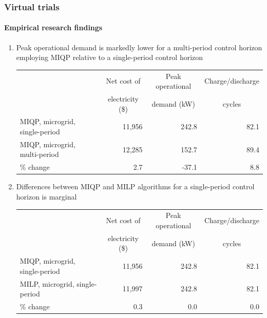 \documentclass[handout, smaller, xcolor=table]{beamer}			%
\newcounter{enumcount}
\begin{document}
\begin{frame}
	\frametitle{Virtual trials}
	\framesubtitle{Empirical research findings}

	\begin{enumerate}
		\setcounter{enumi}{\value{enumcount}}		
		\item  Peak operational demand is markedly lower for a multi-period control horizon employing MIQP relative to a single-period control horizon
			\begin{table}[!h]
			\centering
			{\scriptsize
			\begin{tabular}{l r r r}
				\toprule
				& \multicolumn{1}{c}{Net cost of}	& \multicolumn{1}{c}{Peak operational}	& \multicolumn{1}{c}{Charge/discharge}	\\
				& \multicolumn{1}{c}{	electricity (\$)} 	& \multicolumn{1}{c}{demand (kW)}		&\multicolumn{1}{c}{cycles}	\\
				\midrule
				MIQP, microgrid, single-period		& 11,956	& 242.8	& 82.1	\\
				MIQP, microgrid, multi-period		& 12,285	& 152.7	& 89.4	\\
				\midrule
				\% change	& 2.7		& -37.1	& 8.8		\\
				\bottomrule
			\end{tabular}
			}
			\end{table}
		
		\item  Differences between MIQP and MILP algorithms for a single-period control horizon is marginal
			\begin{table}
			\centering
			{\scriptsize
			\begin{tabular}{l r r r}
				\toprule
				& \multicolumn{1}{c}{Net cost of}	& \multicolumn{1}{c}{Peak operational}	& \multicolumn{1}{c}{Charge/discharge}	\\
				& \multicolumn{1}{c}{	electricity (\$)} 	& \multicolumn{1}{c}{demand (kW)}		&\multicolumn{1}{c}{cycles}	\\
				\midrule
				MIQP, microgrid, single-period		& 11,956	& 242.8	& 82.1	\\
				MILP, microgrid, single-period		& 11,997	& 242.8	& 82.1	\\
				\midrule
				\% change	& 0.3		& 0.0		& 0.0		\\
				\bottomrule
			\end{tabular}
			}
			\end{table}
		
		\setcounter{enumcount}{\value{enumi}}	
	\end{enumerate}

\end{frame}
\end{document}
